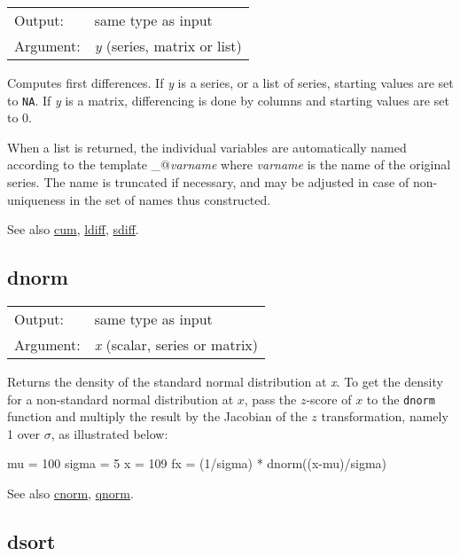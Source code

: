\begin{tabular}{ll}
Output:     & same type as input\\
Argument:   & \textsl{y} (series, matrix or list)\\
\end{tabular}

	  Computes first differences.  If \textsl{y} is a series, or
	  a list of series, starting values are set to \texttt{NA}.  If
	  \textsl{y} is a matrix, differencing is done by columns
	  and starting values are set to 0. 

	  When a list is returned, the individual variables are
	  automatically named according to the template
	  \verb@d_@\textsl{varname} where \textsl{varname} is the
	  name of the original series.  The name is truncated if necessary,
	  and may be adjusted in case of non-uniqueness in the set of names
	  thus constructed.

	  See also \hyperlink{func-cum}{cum}, \hyperlink{func-ldiff}{ldiff}, \hyperlink{func-sdiff}{sdiff}.

\subsection{dnorm}
\hypertarget{func-dnorm}{}

\begin{tabular}{ll}
Output:     & same type as input\\
Argument:   & \textsl{x} (scalar, series or matrix)\\
\end{tabular}

	  Returns the density of the standard normal distribution at
	  \textsl{x}.  To get the density for a non-standard
	  normal distribution at \ensuremath{x}, pass the
	  \ensuremath{z}-score of \ensuremath{x} to the \texttt{dnorm}
	  function and multiply the result by the Jacobian of the
	  \ensuremath{z} transformation, namely 1 over $\sigma$, as
	  illustrated below:

\begin{code}
	  mu = 100
	  sigma = 5
	  x = 109
	  fx = (1/sigma) * dnorm((x-mu)/sigma)

\end{code}

	  See also \hyperlink{func-cnorm}{cnorm}, \hyperlink{func-qnorm}{qnorm}.

\subsection{dsort}
\hypertarget{func-dsort}{}


